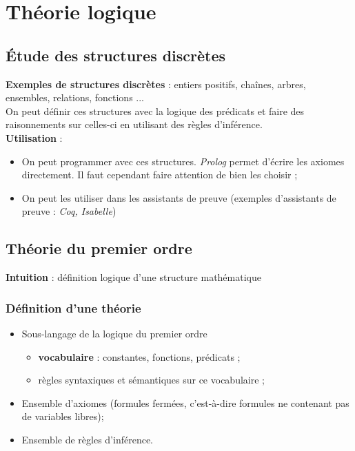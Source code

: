 \chapter{Théorie logique}
\section{Étude des structures discrètes}
\noindent
\textbf{Exemples de structures discrètes} : entiers positifs, chaînes, arbres, ensembles, relations, fonctions ...\\

On peut définir ces structures avec la logique des prédicats et faire des raisonnements sur celles-ci en utilisant des règles d'inférence.\\

\noindent
\textbf{Utilisation} :\begin{itemize}
\item On peut programmer avec ces structures. \textit{Prolog} permet d'écrire les axiomes directement. Il faut cependant faire attention de bien les choisir ;
\item On peut les utiliser dans les assistants de preuve (exemples d'assistants de preuve : \textit{Coq, Isabelle})\\
\end{itemize}

\section{Théorie du premier ordre}
\noindent
\textbf{Intuition} : définition logique d'une structure mathématique

\noindent
\subsection{Définition d'une théorie}
\begin{itemize}
\item Sous-langage de la logique du premier ordre
\begin{itemize}
\item \textbf{vocabulaire} : constantes, fonctions, prédicats ;
\item règles syntaxiques et sémantiques sur ce vocabulaire ;
\end{itemize}
\item Ensemble d'axiomes (formules fermées, c'est-à-dire formules ne contenant pas de variables libres);
\item Ensemble de règles d'inférence.
\end{itemize}

